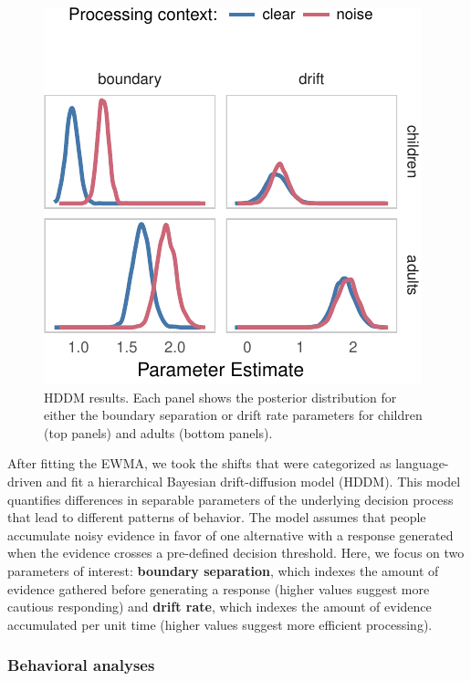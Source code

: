 \documentclass[10pt, letterpaper]{article}
\newenvironment{CodeChunk}{}{}
\begin{document}
\begin{CodeChunk}
\begin{figure}[t]

{\centering \includegraphics[width=0.85\linewidth]{figs/hddm_plot_noise-1} 

}

\caption[HDDM results]{HDDM results. Each panel shows the posterior distribution for either the boundary separation or drift rate parameters for children (top panels) and adults (bottom panels).}\label{fig:hddm_plot_noise}
\end{figure}
\end{CodeChunk}

After fitting the EWMA, we took the shifts that were categorized as
language-driven and fit a hierarchical Bayesian drift-diffusion model
(HDDM). This model quantifies differences in separable parameters of the
underlying decision process that lead to different patterns of behavior.
The model assumes that people accumulate noisy evidence in favor of one
alternative with a response generated when the evidence crosses a
pre-defined decision threshold. Here, we focus on two parameters of
interest: \textbf{boundary separation}, which indexes the amount of
evidence gathered before generating a response (higher values suggest
more cautious responding) and \textbf{drift rate}, which indexes the
amount of evidence accumulated per unit time (higher values suggest more
efficient processing).

\subsubsection{Behavioral analyses}\label{behavioral-analyses}
\end{document}
